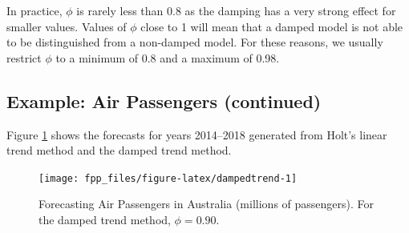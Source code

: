 \documentclass[]{book}
\newenvironment{Shaded}{\begin{snugshade}}{\end{snugshade}}
\newcommand{\DataTypeTok}[1]{\textcolor[rgb]{0.13,0.29,0.53}{#1}}
\newcommand{\DecValTok}[1]{\textcolor[rgb]{0.00,0.00,0.81}{#1}}
\newcommand{\FloatTok}[1]{\textcolor[rgb]{0.00,0.00,0.81}{#1}}
\newcommand{\KeywordTok}[1]{\textcolor[rgb]{0.13,0.29,0.53}{\textbf{#1}}}
\newcommand{\NormalTok}[1]{#1}
\newcommand{\OperatorTok}[1]{\textcolor[rgb]{0.81,0.36,0.00}{\textbf{#1}}}
\newcommand{\OtherTok}[1]{\textcolor[rgb]{0.56,0.35,0.01}{#1}}
\newcommand{\StringTok}[1]{\textcolor[rgb]{0.31,0.60,0.02}{#1}}
\begin{document}
In practice, \(\phi\) is rarely less than 0.8 as the damping has a very strong effect for smaller values. Values of \(\phi\) close to 1 will mean that a damped model is not able to be distinguished from a non-damped model. For these reasons, we usually restrict \(\phi\) to a minimum of 0.8 and a maximum of 0.98.

\hypertarget{example-air-passengers-continued}{%
\subsection*{Example: Air Passengers (continued)}\label{example-air-passengers-continued}}

Figure \ref{fig:dampedtrend} shows the forecasts for years 2014--2018 generated from Holt's linear trend method and the damped trend method.

\begin{Shaded}
\end{Shaded}

\begin{figure}

{\centering \texttt{[image: fpp\_files/figure-latex/dampedtrend-1]} 

}

\caption{Forecasting Air Passengers in Australia (millions of passengers). For the damped trend method, $\phi=0.90$.}\label{fig:dampedtrend}
\end{figure}
\end{document}
